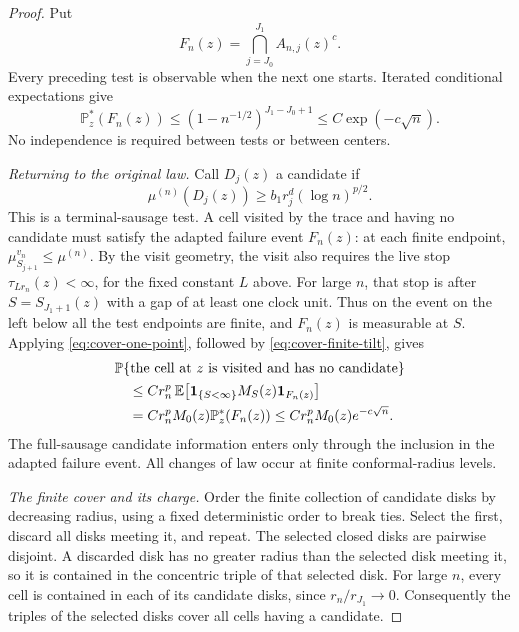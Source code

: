 \begin{proof}
Put
\[
 F_n(z)=\bigcap_{j=J_0}^{J_1}A_{n,j}(z)^c.
\]
Every preceding test is observable when the next one starts.
Iterated conditional expectations give
\begin{equation}
 \mathbb P_z^*(F_n(z))
 \le(1-n^{-1/2})^{J_1-J_0+1}
 \le C\exp(-c\sqrt n).
 \label{eq:cover-failure}
\end{equation}
No independence is required between tests or between centers.

\emph{Returning to the original law.}
Call \(D_j(z)\) a candidate if
\begin{equation}
 \mu^{(n)}(D_j(z))\ge b_1r_j^d(\log n)^{p/2}.
 \label{eq:cover-candidate}
\end{equation}
This is a terminal-sausage test. A cell visited by the trace and
having no candidate must satisfy the adapted failure event \(F_n(z)\):
at each finite endpoint, \(\mu_{S_{j+1}}^{v_n}\le\mu^{(n)}\).
By the visit geometry, the visit also requires the
live stop \(\tau_{Lr_n}(z)<\infty\), for the fixed constant
\(L\) above.  For large \(n\), that stop is after
\(S=S_{J_1+1}(z)\) with a gap of at least one clock unit.
Thus on the event on the left below all the test endpoints are finite,
and \(F_n(z)\) is measurable at \(S\).
Applying \eqref{eq:cover-one-point}, followed by
\eqref{eq:cover-finite-tilt}, gives
\begin{align}
 &\mathbb P\{\text{the cell at }z\text{ is visited and has no candidate}\}
       \notag\\
 &\quad\le C r_n^p\,
       \mathbb E\!\left[
         {\bf1}_{\{S<\infty\}}M_S(z){\bf1}_{F_n(z)}\right]
       \notag\\
 &\quad= C r_n^p M_0(z)\mathbb P_z^*(F_n(z))
       \le C r_n^p M_0(z)e^{-c\sqrt n}.
 \label{eq:cover-missed-cell}
\end{align}
The full-sausage candidate information enters only through the
inclusion in the adapted failure event.  All changes of law
occur at finite conformal-radius levels.

\emph{The finite cover and its charge.}
Order the finite collection of candidate disks by decreasing
radius, using a fixed deterministic order to break ties.
Select the first, discard all disks meeting it, and repeat.
The selected closed disks are pairwise disjoint.  A discarded
disk has no greater radius than the selected disk meeting it,
so it is contained in the concentric triple of that selected
disk.  For large \(n\), every cell is contained in each of its
candidate disks, since \(r_n/r_{J_1}\to0\).  Consequently the
triples of the selected disks cover all cells having a candidate.


\end{proof}
